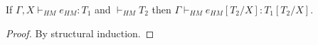 \begin{lemma}
\label{tes}
If $\Gamma,X\vdash_{HM}e_{HM}:T_{1}$ and $\vdash_{HM}T_{2}$ then $\Gamma\vdash_{HM}e_{HM}[T_{2}/X]:T_{1}[T_{2}/X]$.
\begin{proof}
By structural induction.
\end{proof}
\end{lemma}